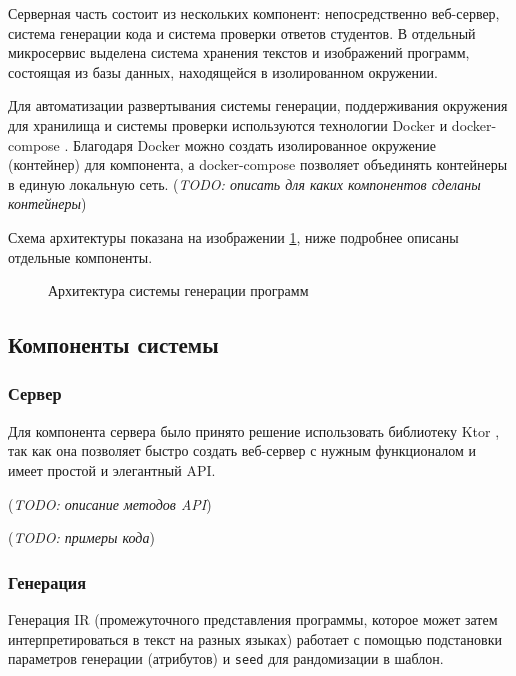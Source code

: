 Серверная часть состоит из нескольких компонент: непосредственно веб-сервер, система генерации
кода и система проверки ответов студентов. В отдельный микросервис выделена система хранения
текстов и изображений программ, состоящая из базы данных, находящейся в изолированном окружении.

Для автоматизации развертывания системы генерации, поддерживания окружения для хранилища и
системы проверки используются технологии Docker \cite{docker} и docker-compose \cite{docker-compose}.
Благодаря Docker можно создать изолированное окружение (контейнер) для компонента, а docker-compose
позволяет объединять контейнеры в единую локальную сеть.
(\textit{TODO: описать для каких компонентов сделаны контейнеры})

Схема архитектуры показана на изображении \ref{architecture}, ниже подробнее описаны отдельные
компоненты.

\begin{figure}[ht]
    \begin{center}
        \scalebox{0.5}{
            
        }
        \caption{\label{architecture} Архитектура системы генерации программ}
    \end{center}
\end{figure}
\clearpage



\subsection{Компоненты системы}
\subsubsection{Сервер}
Для компонента сервера было принято решение использовать библиотеку Ktor \cite{ktor}, так как
она позволяет быстро создать веб-сервер с нужным функционалом и имеет простой и элегантный API.

(\textit{TODO: описание методов API})

(\textit{TODO: примеры кода})

\subsubsection{Генерация}
Генерация IR (промежуточного представления программы, которое может затем
интерпретироваться в текст на разных языках) работает с помощью подстановки
параметров генерации (атрибутов) и \texttt{seed} для рандомизации в шаблон.

